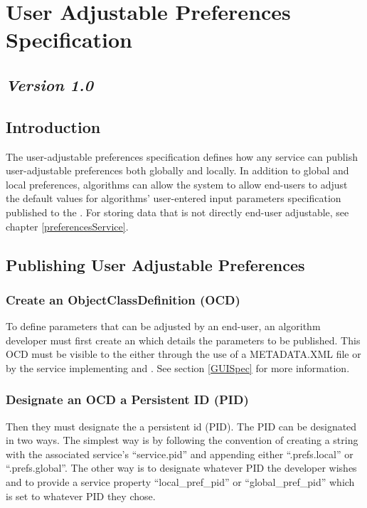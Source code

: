 \section{User Adjustable Preferences Specification}
\label{userPrefsSpec}
\subsection*{\textit{Version 1.0}}
\subsection{Introduction}

The user-adjustable preferences specification defines how any service can publish
user-adjustable preferences both globally and locally. In addition to global and
local preferences, algorithms can allow the system to allow end-users to adjust
the default values for algorithms' user-entered input parameters specification
published to the . For storing data that is not directly
end-user adjustable, see chapter \ref{preferencesService}.

\subsection{Publishing User Adjustable Preferences}

\subsubsection*{Create an ObjectClassDefinition (OCD)} To define parameters that
can be adjusted by an end-user, an algorithm developer must first create an
 which details the parameters to be published. This
OCD must be visible to the  either through the use of a
METADATA.XML file or by the service implementing  and
. See section \ref{GUISpec} for more information.

\subsubsection*{Designate an OCD a Persistent ID (PID)} Then they must designate
the  a persistent id (PID). The PID can be
designated in two ways. The simplest way is by following the convention of
creating a string with the associated service's ``service.pid'' and appending
either ``.prefs.local'' or ``.prefs.global''. The other way is to designate
whatever PID the developer wishes and to provide a service property
``local\_pref\_pid'' or ``global\_pref\_pid'' which is set to whatever PID they
chose.

